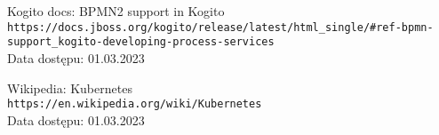 \documentclass[declaration,shortabstract,mgr]{iithesis}
\begin{document}
\begin{thebibliography}{1}
Kogito docs: BPMN2 support in Kogito \\
\texttt{https://docs.jboss.org/kogito/release/latest/html\_single/\#ref-bpmn-support\_kogito-developing-process-services} \\
Data dostępu: 01.03.2023

Wikipedia: Kubernetes \\
\texttt{https://en.wikipedia.org/wiki/Kubernetes} \\
Data dostępu: 01.03.2023





\end{thebibliography}
\end{document}
